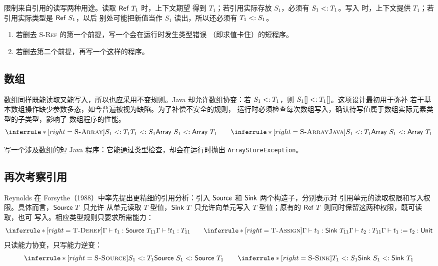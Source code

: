 限制来自引用的读写两种用途。读取 \(\mathsf{Ref}\ T_1\) 时，上下文期望
得到 \(T_1\)；若引用实际存放 \(S_1\)，必须有 \(S_1\mathrel{<:} T_1\)。写入
时，上下文提供 \(T_1\)；若引用实际类型是 \(\mathsf{Ref}\ S_1\)，以后
别处可能把新值当作 \(S_1\) 读出，所以还必须有 \(T_1\mathrel{<:} S_1\)。

\begin{exercise}[\(\star\), \(\nrightarrow\)]
\label{ex:15.5.2}
\begin{enumerate}
\item 若删去 \textsc{S-Ref} 的第一个前提，写一个会在运行时发生类型错误
  （即求值卡住）的短程序。
\item 若删去第二个前提，再写一个这样的程序。
\end{enumerate}
\end{exercise}

\subsection*{数组}

数组同样既能读取又能写入，所以也应采用不变规则。Java 却允许数组协变：若
\(S_1\mathrel{<:} T_1\)，则 \(S_1[]\mathrel{<:} T_1[]\)。这项设计最初用于弥补
若干基本数组操作缺少参数多态，如今普遍被视为缺陷。为了补偿不安全的规则，
运行时必须检查每次数组写入，确认待写值属于数组实际元素类型的子类型，影响了
数组程序的性能。
\[
\inferrule*[right=\textsc{S-Array}]
 {S_1\subtype T_1\\T_1\subtype S_1}
 {\tapltype{Array}\ S_1\subtype\tapltype{Array}\ T_1}
\qquad
\inferrule*[right=\textsc{S-ArrayJava}]
 {S_1\subtype T_1}
 {\tapltype{Array}\ S_1\subtype\tapltype{Array}\ T_1}
\]

\begin{exercise}[\(\star\star\star\), \(\nrightarrow\)]
\label{ex:15.5.3}
写一个涉及数组的短 Java 程序：它能通过类型检查，却会在运行时抛出
\texttt{ArrayStoreException}。
\end{exercise}

\subsection*{再次考察引用}

Reynolds 在 Forsythe（1988）中率先提出更精细的引用分析：引入
\(\mathsf{Source}\) 和 \(\mathsf{Sink}\) 两个构造子，分别表示对
引用单元的读取权限和写入权限。具体而言，\(\mathsf{Source}\ T\) 只允许
从单元读取 \(T\) 型值，\(\mathsf{Sink}\ T\) 只允许向单元写入 \(T\)
型值；原有的 \(\mathsf{Ref}\ T\) 则同时保留这两种权限，既可读取，也可
写入。相应类型规则只要求所需能力：
\[
\inferrule*[right=\textsc{T-Deref}]
 {\Gamma\vdash t_1:\tapltype{Source}\ T_{11}}
 {\Gamma\vdash {!t_1}:T_{11}}
\qquad
\inferrule*[right=\textsc{T-Assign}]
 {\Gamma\vdash t_1:\tapltype{Sink}\ T_{11}\\
  \Gamma\vdash t_2:T_{11}}
 {\Gamma\vdash t_1:=t_2:\tapltype{Unit}}
\]
只读能力协变，只写能力逆变：
\[
\inferrule*[right=\textsc{S-Source}]
 {S_1\subtype T_1}
 {\tapltype{Source}\ S_1\subtype\tapltype{Source}\ T_1}
\qquad
\inferrule*[right=\textsc{S-Sink}]
 {T_1\subtype S_1}
 {\tapltype{Sink}\ S_1\subtype\tapltype{Sink}\ T_1}
\]

